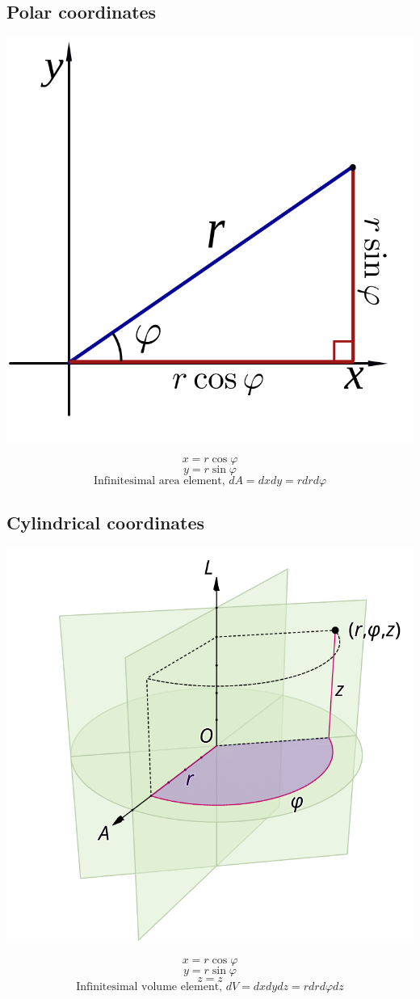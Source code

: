 \documentclass[11pt]{article}
\begin{document}
\subsection{Polar coordinates}
\label{sec:orgc3cd2f6}
\begin{center}
\includegraphics[width=.9\linewidth]{./images/polar-coordinates.png}
\end{center}
\[x = r \cos \varphi\]
\[y = r \sin \varphi\]
\[\text{Infinitesimal area element, } dA = dx dy = r dr d \varphi\]
\subsection{Cylindrical coordinates}
\label{sec:org9e6722d}
\begin{center}
\includegraphics[width=.9\linewidth]{./images/cylindrical-coordinates.png}
\end{center}
\[x = r \cos \varphi\]
\[y = r \sin \varphi\]
\[z = z\]
\[\text{Infinitesimal volume element, } dV = dx dy dz = r dr d \varphi dz\]
\end{document}

